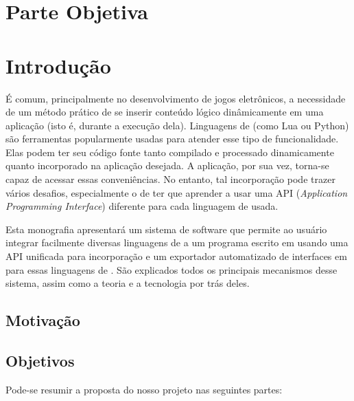 \chapter*{Parte Objetiva}
\label{sec:parte_objetiva}
\chapter{Introdução}
\label{sec:intr}

É comum, principalmente no desenvolvimento de jogos eletrônicos, a necessidade
de um método prático de se inserir conteúdo lógico dinâmicamente em uma
aplicação (isto é, durante a execução dela). Linguagens de \script{} (como Lua ou
Python) são ferramentas popularmente usadas para atender esse tipo de
funcionalidade. Elas podem ter seu código fonte tanto compilado e processado
dinamicamente quanto incorporado na aplicação desejada. A aplicação, por sua
vez, torna-se capaz de acessar essas conveniências. No entanto, tal incorporação
pode trazer vários desafios, especialmente o de ter que aprender a usar uma API
(\textit{Application Programming Interface}) diferente para cada linguagem de
\script{} usada.

Esta monografia apresentará um sistema de software que permite ao usuário
integrar facilmente diversas linguagens de \script{} a um programa escrito em
\CXX{} usando uma API unificada para incorporação e um exportador
automatizado de interfaces em \CXX{} para essas linguagens de \script{}. São
explicados todos os principais mecanismos desse sistema, assim como a teoria e a
tecnologia por trás deles.

\section{Motivação}
\label{sec:intr:motivacao}

\section{Objetivos}
\label{sec:intr:objetivos}

Pode-se resumir a proposta do nosso projeto nas seguintes partes:

